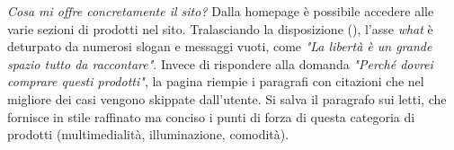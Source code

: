 \textit{Cosa mi offre concretamente il sito?}\newline
Dalla homepage è possibile accedere alle varie sezioni di prodotti nel sito. Tralasciando la disposizione (), l'asse \textit{what} è deturpato da numerosi slogan e messaggi vuoti, come \textit{"La libertà è un grande spazio tutto da raccontare"}. Invece di rispondere alla domanda \textit{"Perché dovrei comprare questi prodotti"}, la pagina riempie i paragrafi con citazioni che nel migliore dei casi vengono skippate dall'utente. Si salva il paragrafo sui letti, che fornisce in stile raffinato ma conciso i punti di forza di questa categoria di prodotti (multimedialità, illuminazione, comodità).